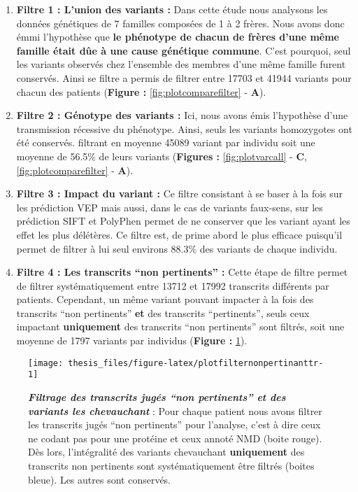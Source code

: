 \documentclass[12pt,twoside]{ugathesis}
\begin{document}
\begin{enumerate}
\def\labelenumi{\arabic{enumi}.}
\item
  \textbf{Filtre 1 : L'union des variants :} Dans cette étude nous
  analysons les données génétiques de 7 familles composées de 1 à 2
  frères. Nous avons donc émmi l'hypothèse que \textbf{le phénotype de
  chacun de frères d'une même famille était dûe à une cause génétique
  commune}. C'est pourquoi, seul les variants observés chez l'ensemble
  des membres d'une même famille furent conservés. Ainsi se filtre a
  permis de filtrer entre 17703 et 41944 variants pour chacun des
  patients (\textbf{Figure : }\ref{fig:plotcomparefilter} - \textbf{A}).
\item
  \textbf{Filtre 2 : Génotype des variants :} Ici, nous avons émis
  l'hypothèse d'une transmission récessive du phénotype. Ainsi, seuls
  les variants homozygotes ont été conservés. filtrant en moyenne 45089
  variant par individu soit une moyenne de 56.5\% de leurs variants
  (\textbf{Figures : }\ref{fig:plotvarcall} - \textbf{C},
  \ref{fig:plotcomparefilter} - \textbf{A}).
\item
  \textbf{Filtre 3 : Impact du variant :} Ce filtre consistant à se
  baser à la fois sur les prédiction VEP mais aussi, dans le cas de
  variants faux-sens, sur les prédiction SIFT et PolyPhen permet de ne
  conserver que les variant ayant les effet les plus délétères. Ce
  filtre est, de prime abord le plus efficace puisqu'il permet de
  filtrer à lui seul environs 88.3\% des variants de chaque individu.
\item
  \textbf{Filtre 4 : Les transcrits ``non pertinents'' :} Cette étape de
  filtre permet de filtrer systématiquement entre 13712 et 17992
  transcrits différents par patients. Cependant, un même variant pouvant
  impacter à la fois des transcrits ``non pertinents'' \textbf{et} des
  transcrits ``pertinents'', seuls ceux impactant \textbf{uniquement}
  des transcrits ``non pertinents'' sont filtrés, soit une moyenne de
  1797 variants par individus (\textbf{Figure :
  }\ref{fig:plotfilternonpertinanttr}).
\end{enumerate}

\newpage 

\begin{figure}

{\centering \texttt{[image: thesis\_files/figure-latex/plotfilternonpertinanttr-1]} 

}

\caption[Filtrage des transcrits jugés "non pertinents" et des variants les chevauchant]{\textbf{\emph{Filtrage des transcrits
jugés ``non pertinents'' et des variants les chevauchant}} : Pour chaque
patient nous avons filtrer les transcrits jugés ``non pertinents'' pour
l'analyse, c'est à dire ceux ne codant pas pour une protéine et ceux
annoté NMD (boite rouge). Dès lors, l'intégralité des variants
chevauchant \textbf{uniquement} des transcrits non pertinents sont
systématiquement être filtrés (boites bleue). Les autres sont conservés.}\label{fig:plotfilternonpertinanttr}
\end{figure}
\end{document}
